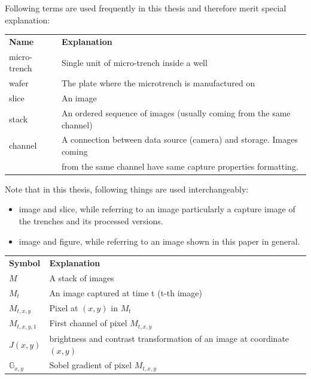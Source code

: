 \documentclass[pdftex,12pt,a4paper]{report}
\begin{document}
{
\flushleft

Following terms are used frequently in this thesis and therefore merit special explanation:

\begin{tabular}{ l l }
\textbf{Name} & \textbf{Explanation} \\
micro-trench & Single unit of micro-trench inside a well \\
wafer & The plate where the microtrench is manufactured on\\
slice & An image \\
stack & An ordered sequence of images (usually coming from the same channel) \\
channel & A connection between data source (camera) and storage. Images coming\\
 & from the same channel have same capture properties formatting.
\end{tabular}

\vspace{5mm}

Note that in this thesis, following things are used interchangeably:

\begin{itemize}
\item image and slice, while referring to an image particularly a capture image of the trenches and its processed versions.
\item image and figure, while referring to an image shown in this paper in general.
\end{itemize}



\vspace{5mm}

\begin{tabular}{ l l }
\textbf{Symbol} & \textbf{Explanation} \\
$M$ & A stack of images \\
$M_t$ & An image captured at time t (t-th image) \\
$M_{t, x, y}$ & Pixel at $(x, y)$ in $M_t$ \\
$M_{t, x, y, 1}$ & First channel of pixel $M_{t, x, y}$ \\
$J(x, y)$ & brightness and contrast transformation of an image at coordinate $(x, y)$\\
$\mathbb{G}_{x, y}$ & Sobel gradient of pixel $M_{t, x, y}$\\
\end{tabular}
}
\newpage
\end{document}
